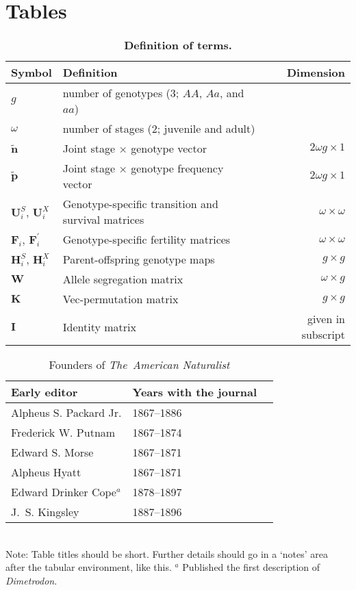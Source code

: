\documentclass[11pt]{article}
\def\mbf#1{\mathbf{#1}}
\begin{document}
\newpage{}



\section{Tables}
\renewcommand{\thetable}{\arabic{table}}
\setcounter{table}{0}


\begin{table}[htbp]
\centering
\caption{\bf Definition of terms.}
\label{tab:Terms}
\begin{tabular}{ l l r }
 \toprule
Symbol & Definition & Dimension \\
\hline
$g$      & number of genotypes ($3$; $AA$, $Aa$, and $aa$) & \\
$\omega$ & number of stages ($2$; juvenile and adult) & \\
$\tilde{\mbf{n}}$ & Joint stage $\times$ genotype vector & $2 \omega g \times 1$ \\
$\tilde{\mbf{p}}$ & Joint stage $\times$ genotype frequency vector & $2 \omega g \times 1$ \\

$\mbf{U}^{S}_{i}$, $\mbf{U}^{X}_{i}$ & Genotype-specific transition and survival matrices & $\omega \times \omega$ \\
$\mbf{F}_{i}$, $\mbf{F}^{\prime}_{i}$ & Genotype-specific fertility matrices & $\omega \times \omega$ \\
$\mbf{H}^{S}_{i}$, $\mbf{H}^{X}_{i}$ & Parent-offspring genotype maps & $g \times g$ \\
$\mbf{W}$   & Allele segregation matrix & $\omega \times g$ \\
$\mbf{K}$   & Vec-permutation matrix & $g \times g$ \\
$\mbf{I}$   & Identity matrix & given in subscript \\
\hline
\end{tabular}
\end{table}
\newpage{}




\begin{table}[h]
\caption{Founders of \textit{The~American Naturalist}}
\label{Table:Founders}
\centering
\begin{tabular}{lll}\hline
Early editor            & Years with the journal \\ \hline
Alpheus S. Packard Jr.  & 1867--1886 \\
Frederick W. Putnam     & 1867--1874 \\ 
Edward S. Morse         & 1867--1871 \\ 
Alpheus Hyatt           & 1867--1871 \\
Edward Drinker Cope$^a$ & 1878--1897 \\
J.~S. Kingsley          & 1887--1896 \\ \hline 
\end{tabular}
\bigskip{}
\\
{\footnotesize Note: Table titles should be short. Further details should go in a `notes' area after the tabular environment, like this. $^a$ Published the first description of \textit{Dimetrodon}.}
\end{table}
\end{document}
